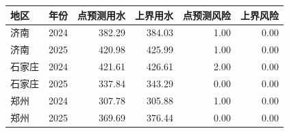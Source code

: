 \begin{tabular}{llrrrr}
\toprule
地区 & 年份 & 点预测用水 & 上界用水 & 点预测风险 & 上界风险 \\
\midrule
济南 & 2024 & 382.29 & 384.03 & 1.00 & 0.00 \\
济南 & 2025 & 420.98 & 425.99 & 1.00 & 0.00 \\
石家庄 & 2024 & 421.61 & 426.61 & 2.00 & 0.00 \\
石家庄 & 2025 & 337.84 & 343.29 & 0.00 & 0.00 \\
郑州 & 2024 & 307.78 & 305.88 & 1.00 & 0.00 \\
郑州 & 2025 & 369.69 & 376.44 & 0.00 & 0.00 \\
\bottomrule
\end{tabular}